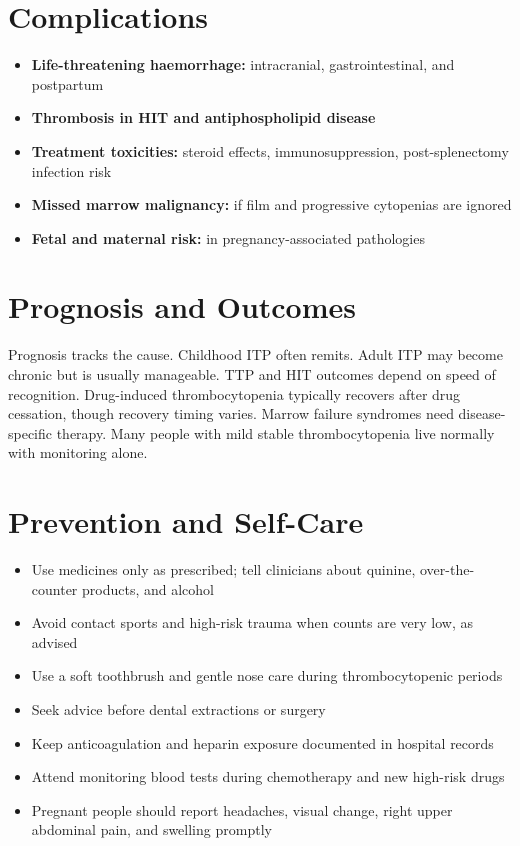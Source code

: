 \section*{Complications}
\begin{itemize}
    \item \textbf{Life-threatening haemorrhage:} intracranial, gastrointestinal, and postpartum
    \item \textbf{Thrombosis in HIT and antiphospholipid disease}
    \item \textbf{Treatment toxicities:} steroid effects, immunosuppression, post-splenectomy infection risk
    \item \textbf{Missed marrow malignancy:} if film and progressive cytopenias are ignored
    \item \textbf{Fetal and maternal risk:} in pregnancy-associated pathologies
\end{itemize}

\section*{Prognosis and Outcomes}
Prognosis tracks the cause. Childhood ITP often remits. Adult ITP may become chronic but is usually manageable. TTP and HIT outcomes depend on speed of recognition. Drug-induced thrombocytopenia typically recovers after drug cessation, though recovery timing varies. Marrow failure syndromes need disease-specific therapy. Many people with mild stable thrombocytopenia live normally with monitoring alone.

\section*{Prevention and Self-Care}
\begin{itemize}
    \item Use medicines only as prescribed; tell clinicians about quinine, over-the-counter products, and alcohol
    \item Avoid contact sports and high-risk trauma when counts are very low, as advised
    \item Use a soft toothbrush and gentle nose care during thrombocytopenic periods
    \item Seek advice before dental extractions or surgery
    \item Keep anticoagulation and heparin exposure documented in hospital records
    \item Attend monitoring blood tests during chemotherapy and new high-risk drugs
    \item Pregnant people should report headaches, visual change, right upper abdominal pain, and swelling promptly
\end{itemize}

